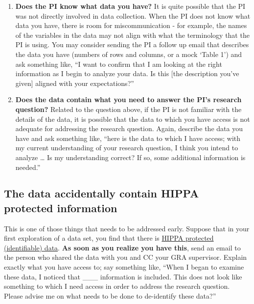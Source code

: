 \documentclass[
]{book}
\begin{document}
\begin{enumerate}
\def\labelenumi{\arabic{enumi}.}
\item
  \textbf{Does the PI know what data you have?} It is quite possible that the PI was not directly involved in data collection. When the PI does not know what data you have, there is room for miscommunication - for example, the names of the variables in the data may not align with what the terminology that the PI is using. You may consider sending the PI a follow up email that describes the data you have (numbers of rows and columns, or a mock `Table 1') and ask something like, ``I want to confirm that I am looking at the right information as I begin to analyze your data. Is this {[}the description you've given{]} aligned with your expectations?''
\item
  \textbf{Does the data contain what you need to answer the PI's research question?} Related to the question above, if the PI is not familiar with the details of the data, it is possible that the data to which you have access is not adequate for addressing the research question. Again, describe the data you have and ask something like, ``here is the data to which I have access; with my current understanding of your research question, I think you intend to analyze \ldots{} Is my understanding correct? If so, some additional information is needed.''
\end{enumerate}

\hypertarget{the-data-accidentally-contain-hippa-protected-information}{%
\subsection{The data accidentally contain HIPPA protected information}\label{the-data-accidentally-contain-hippa-protected-information}}

This is one of those things that needs to be addressed early. Suppose that in your first exploration of a data set, you find that there is \href{https://compliancy-group.com/what-is-hipaa-pii/\#:~:text=What\%20Kinds\%20of\%20Information\%20Constitute,numbers\%2C\%20and\%20bank\%20account\%20numbers.}{HIPPA protected (identifiable) data}. \textbf{As soon as you realize you have this}, send an email to the person who shared the data with you and CC your GRA supervisor. Explain exactly what you have access to; say something like, ``When I began to examine these data, I noticed that \_\_\_ information is included. This does not look like something to which I need access in order to address the research question. Please advise me on what needs to be done to de-identify these data?''
\end{document}
